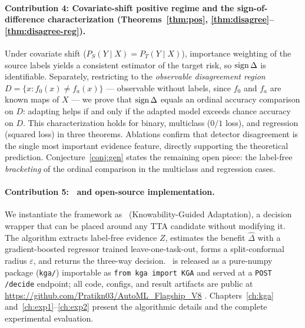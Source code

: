\paragraph{Contribution 4: Covariate-shift positive regime and the
sign-of-difference characterization
(Theorems~\ref{thm:pos}, \ref{thm:disagree}--\ref{thm:disagree-reg}).}
Under covariate shift ($P_S(Y \mid X) = P_T(Y \mid X)$), importance
weighting of the source labels yields a consistent estimator of the target
risk, so $\operatorname{sign}\Delta$ is identifiable.
Separately, restricting to the \emph{observable disagreement region} $D =
\{x : f_0(x) \neq f_a(x)\}$ --- observable without labels, since $f_0$ and
$f_a$ are known maps of $X$ --- we prove that $\operatorname{sign}\Delta$ equals an
ordinal accuracy comparison on $D$: adapting helps if and only if the
adapted model exceeds chance accuracy on $D$.
This characterization holds for binary, multiclass ($0/1$ loss), and
regression (squared loss) in three theorems.
Ablations confirm that detector disagreement is the single most important
evidence feature, directly supporting the theoretical prediction.
Conjecture~\ref{conj:gen} states the remaining open piece: the label-free
\emph{bracketing} of the ordinal comparison in the multiclass and regression
cases.

\paragraph{Contribution 5: \KGA\ and open-source implementation.}
We instantiate the framework as \KGA\ (Knowability-Guided Adaptation), a
decision wrapper that can be placed around any TTA candidate without
modifying it.
The algorithm extracts label-free evidence $Z$, estimates the benefit
$\widehat{\Delta}$ with a gradient-boosted regressor trained leave-one-task-out,
forms a split-conformal radius $\varepsilon$, and returns the three-way
decision.
\KGA\ is released as a pure-numpy package (\texttt{kga/}) importable as
\texttt{from kga import KGA} and served at a \texttt{POST /decide} endpoint;
all code, configs, and result artifacts are public at
\url{https://github.com/Pratikn03/AutoML_Flagship_V8} \cite{kbound2026repo}.
Chapters~\ref{ch:kga} and~\ref{ch:exp1}--\ref{ch:exp2} present the
algorithmic details and the complete experimental evaluation.

